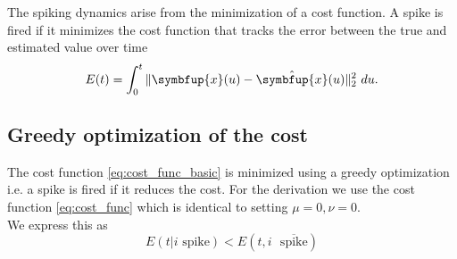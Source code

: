 The spiking dynamics arise from the minimization of a cost function. A spike is fired if it minimizes the cost function that tracks the error between the true and estimated value over time
\begin{equation}\label{eq:cost_func_basic}
E(t)=\int_0^t \|\symbfup{x}(u)-\hat{\symbfup{x}}(u)\|_2^2 \ du.
\end{equation}


\subsection{Greedy optimization of the cost}
The cost function \cref{eq:cost_func_basic} is minimized using a greedy optimization i.e. a spike is fired if it reduces the cost. For the derivation we use the cost function \cref{eq:cost_func} which is identical to setting $\mu = 0,\nu= 0$.\\
We express this as
\begin{equation}\label{eq:spike_condition}
	E(t|i \text{ spike}) < E(t,i \text{ }\overline{\text{spike}})
\end{equation}

